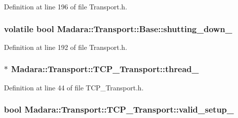 Definition at line 196 of file Transport.h.

\hypertarget{classMadara_1_1Transport_1_1Base_a6c3d03895e92c93265704052ab707f8a}{
\subsubsection[{shutting\_\-down\_\-}]{\setlength{\rightskip}{0pt plus 5cm}volatile bool {\bf Madara::Transport::Base::shutting\_\-down\_\-}}}
\label{dc/d97/classMadara_1_1Transport_1_1Base_a6c3d03895e92c93265704052ab707f8a}


Definition at line 192 of file Transport.h.

\hypertarget{classMadara_1_1Transport_1_1TCP__Transport_a3786a18bcea7954c074bfc74541944bd}{
\subsubsection[{thread\_\-}]{$\ast$ {\bf Madara::Transport::TCP\_\-Transport::thread\_\-}}}
\label{d6/df1/classMadara_1_1Transport_1_1TCP__Transport_a3786a18bcea7954c074bfc74541944bd}


Definition at line 44 of file TCP\_\-Transport.h.

\hypertarget{classMadara_1_1Transport_1_1TCP__Transport_a2d4ff7935612176cf98a4feaa9d15510}{
\subsubsection[{valid\_\-setup\_\-}]{\setlength{\rightskip}{0pt plus 5cm}bool {\bf Madara::Transport::TCP\_\-Transport::valid\_\-setup\_\-}}}
\label{d6/df1/classMadara_1_1Transport_1_1TCP__Transport_a2d4ff7935612176cf98a4feaa9d15510}


